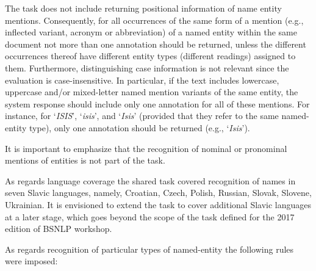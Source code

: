 \documentclass[11pt]{article}
\begin{document}
\noindent The task does not include returning positional information of name entity mentions. Consequently,
for all occurrences of the same form of a mention (e.g., inflected variant, acronym or abbreviation) of a named entity 
within the same document not more than one annotation should be returned, unless the different occurrences thereof have 
different entity types (different readings) assigned to them. Furthermore, distinguishing case information is not relevant
since the evaluation is case-insensitive. In particular, if the text includes lowercase, uppercase and/or mixed-letter 
named mention variants of the same entity, the system response should include only one annotation for all of these mentions. 
For instance, for `\textit{ISIS}', `\textit{isis}', and `\textit{Isis}' (provided that they refer to the same named-entity type), 
only one annotation should be returned (e.g., `\textit{Isis}').

It is important to emphasize that the recognition of nominal or pronominal mentions of entities is not part of the task. 

As regards language coverage the shared task covered recognition of names in seven Slavic languages, namely, Croatian, 
Czech, Polish, Russian, Slovak, Slovene, Ukrainian. It is envisioned to extend the task to cover additional Slavic 
languages at a later stage, which goes beyond the scope of the task defined for the 2017 edition of BSNLP workshop.

As regards recognition of particular types of named-entity the following rules were imposed:
\end{document}

